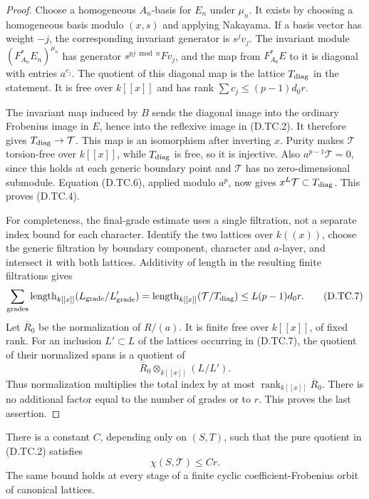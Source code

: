 \begin{proof}
Choose a homogeneous $A_n$-basis for $E_n$ under $\mu_n$.
It exists by choosing a homogeneous basis modulo $(x,s)$
and applying Nakayama.  If a basis vector has weight $-j$,
the corresponding invariant generator is $s^jv_j$.
The invariant module
$(F_{A_n}^*E_n)^{\mu_n}$ has generator
$s^{pj\bmod n}Fv_j$, and the map from $F_{A_0}^*E$
to it is diagonal with entries $a^{c_j}$.
The quotient of this diagonal map is the lattice
$T_{\rm diag}$ in the statement.  It is free over $k[[x]]$
and has rank $\sum c_j\le(p-1)d_0r$.

The invariant map induced by $B$ sends the diagonal image
into the ordinary Frobenius image in $E$, hence into the
reflexive image in (D.TC.2).  It therefore gives
$T_{\rm diag}\to\mathcal T$.  This map is an isomorphism
after inverting $x$.  Purity makes $\mathcal T$ torsion-free
over $k[[x]]$, while $T_{\rm diag}$ is free, so it is
injective.  Also $a^{p-1}\mathcal T=0$, since this holds at
each generic boundary point and $\mathcal T$ has no
zero-dimensional submodule.  Equation (D.TC.6), applied
modulo $a^p$, now gives
$x^L\mathcal T\subset T_{\rm diag}$.  This proves (D.TC.4).

For completeness, the final-grade estimate uses a single
filtration, not a separate index bound for each character.
Identify the two lattices over $k((x))$, choose the generic
filtration by boundary component, character and $a$-layer,
and intersect it with both lattices.  Additivity of length
in the resulting finite filtrations gives
\[
 \sum_{\rm grades}\operatorname{length}_{k[[x]]}
        (L_{\rm grade}/L'_{\rm grade})
     =\operatorname{length}_{k[[x]]}(\mathcal T/T_{\rm diag})
     \le L(p-1)d_0r.                                    \tag{D.TC.7}
\]
Let $\overline R_0$ be the normalization of $R/(a)$.
It is finite free over $k[[x]]$, of fixed rank.  For an
inclusion $L'\subset L$ of the lattices occurring in
(D.TC.7), the quotient of their normalized spans is a
quotient of
\[
             \overline R_0\otimes_{k[[x]]}(L/L').
\]
Thus normalization multiplies the total index by at most
$\operatorname{rank}_{k[[x]]}\overline R_0$.  There is no
additional factor equal to the number of grades or to $r$.
This proves the last assertion.
\end{proof}

\begin{lemma}
\label{D:tame-canonical-Euler}
There is a constant $C$, depending only on $(S,T)$, such that
the pure quotient in (D.TC.2) satisfies
\[
                              \chi(S,\mathcal T)\le Cr.  \tag{D.TC.8}
\]
The same bound holds at every stage of a finite cyclic
coefficient-Frobenius orbit of canonical lattices.
\end{lemma}

